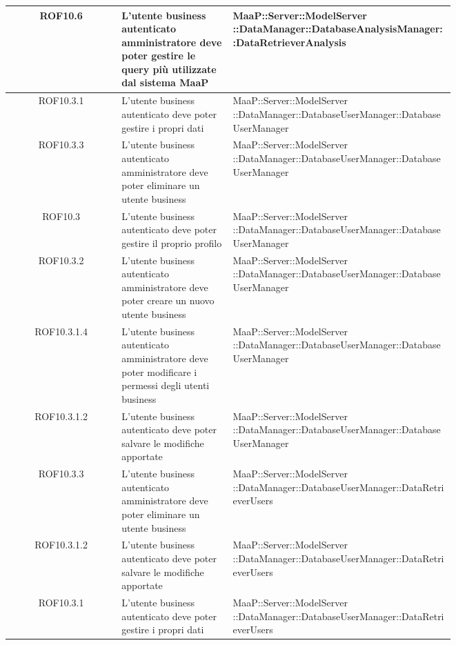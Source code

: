 \begin{center}
\begin{longtable}{|c|p{0.25\linewidth}|p{0.5\linewidth}|}
\midrule
ROF10.6
& L'utente business autenticato amministratore deve poter gestire le query più utilizzate dal sistema MaaP
& MaaP::Server::ModelServer ::DataManager::DatabaseAnalysisManager::DataRetrieverAnalysis\\

\midrule
ROF10.3.1
& L'utente business autenticato deve poter gestire i propri dati
& MaaP::Server::ModelServer ::DataManager::DatabaseUserManager::DatabaseUserManager\\

\midrule
ROF10.3.3
& L'utente business autenticato amministratore deve poter eliminare un utente business
& MaaP::Server::ModelServer ::DataManager::DatabaseUserManager::DatabaseUserManager\\

\midrule
ROF10.3
& L'utente business autenticato deve poter gestire il proprio profilo
& MaaP::Server::ModelServer ::DataManager::DatabaseUserManager::DatabaseUserManager\\

\midrule
ROF10.3.2
& L'utente business autenticato amministratore deve poter creare un nuovo utente business
& MaaP::Server::ModelServer ::DataManager::DatabaseUserManager::DatabaseUserManager\\

\midrule
ROF10.3.1.4
& L'utente business autenticato amministratore deve poter modificare i permessi degli utenti business
& MaaP::Server::ModelServer ::DataManager::DatabaseUserManager::DatabaseUserManager\\

\midrule
ROF10.3.1.2
& L'utente business autenticato deve poter  salvare le modifiche apportate
& MaaP::Server::ModelServer ::DataManager::DatabaseUserManager::DatabaseUserManager\\

\midrule
ROF10.3.3
& L'utente business autenticato amministratore deve poter eliminare un utente business
& MaaP::Server::ModelServer ::DataManager::DatabaseUserManager::DataRetrieverUsers\\

\midrule
ROF10.3.1.2
& L'utente business autenticato deve poter  salvare le modifiche apportate
& MaaP::Server::ModelServer ::DataManager::DatabaseUserManager::DataRetrieverUsers\\

\midrule
ROF10.3.1
& L'utente business autenticato deve poter gestire i propri dati
& MaaP::Server::ModelServer ::DataManager::DatabaseUserManager::DataRetrieverUsers\\


\end{longtable}
\end{center}
